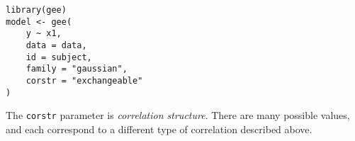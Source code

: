 \documentclass[titlepage, 12pt, leqno]{article}
\begin{document}
\begin{verbatim}
library(gee)
model <- gee(
    y ~ x1,
    data = data,
    id = subject,
    family = "gaussian",
    corstr = "exchangeable"
)
\end{verbatim}

\begin{note}
    The \texttt{corstr} parameter is \textit{correlation structure}. There are many
    possible values, and each correspond to a different type of correlation described
    above.
\end{note}
\end{document}
